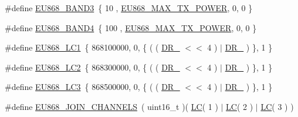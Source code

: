 \begin{DoxyCompactItemize}
\#define \hyperlink{group__REGIONEU868_gab7e01f2131642f135babcd1189d429d3}{E\+U868\+\_\+\+B\+A\+N\+D3}~\{ 10  , \hyperlink{group__REGIONEU868_ga39e338c7f8454f594302811f61d9560d}{E\+U868\+\_\+\+M\+A\+X\+\_\+\+T\+X\+\_\+\+P\+O\+W\+ER}, 0,  0 \}
\item 
\#define \hyperlink{group__REGIONEU868_ga0caf48019c492d018b3442e1975535f4}{E\+U868\+\_\+\+B\+A\+N\+D4}~\{ 100 , \hyperlink{group__REGIONEU868_ga39e338c7f8454f594302811f61d9560d}{E\+U868\+\_\+\+M\+A\+X\+\_\+\+T\+X\+\_\+\+P\+O\+W\+ER}, 0,  0 \}
\item 
\#define \hyperlink{group__REGIONEU868_ga397b82ce41a0eb594465b5728586d76e}{E\+U868\+\_\+\+L\+C1}~\{ 868100000, 0, \{ ( ( \hyperlink{group__REGION_ga872e12c82020c02a7f70a1c6ed1375df}{D\+R\+\_} $<$$<$ 4 ) $\vert$ \hyperlink{group__REGION_ga6c4ef966b4f3d5eb7597b087f2b97095}{D\+R\+\_} ) \}, 1 \}
\item 
\#define \hyperlink{group__REGIONEU868_ga992597dafaae7a354ae4aeaab6306954}{E\+U868\+\_\+\+L\+C2}~\{ 868300000, 0, \{ ( ( \hyperlink{group__REGION_ga872e12c82020c02a7f70a1c6ed1375df}{D\+R\+\_} $<$$<$ 4 ) $\vert$ \hyperlink{group__REGION_ga6c4ef966b4f3d5eb7597b087f2b97095}{D\+R\+\_} ) \}, 1 \}
\item 
\#define \hyperlink{group__REGIONEU868_ga6feb4643d2e07e54de83109e680379d2}{E\+U868\+\_\+\+L\+C3}~\{ 868500000, 0, \{ ( ( \hyperlink{group__REGION_ga872e12c82020c02a7f70a1c6ed1375df}{D\+R\+\_} $<$$<$ 4 ) $\vert$ \hyperlink{group__REGION_ga6c4ef966b4f3d5eb7597b087f2b97095}{D\+R\+\_} ) \}, 1 \}
\item 
\#define \hyperlink{group__REGIONEU868_ga66750d8b2f9ba9f6b8466f190207d53f}{E\+U868\+\_\+\+J\+O\+I\+N\+\_\+\+C\+H\+A\+N\+N\+E\+LS}~( uint16\+\_\+t )( \hyperlink{group__REGION_ga12fa17e5c1016e01a9d82c25027deb1b}{LC}( 1 ) $\vert$ \hyperlink{group__REGION_ga12fa17e5c1016e01a9d82c25027deb1b}{LC}( 2 ) $\vert$ \hyperlink{group__REGION_ga12fa17e5c1016e01a9d82c25027deb1b}{LC}( 3 ) )
\end{DoxyCompactItemize}
